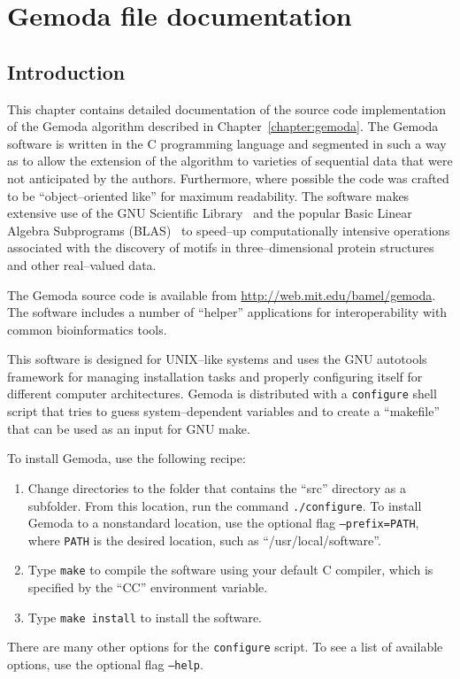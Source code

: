 
\setlength{\parindent}{0cm}
\setlength{\parskip}{0.2cm}
\addtocounter{secnumdepth}{1}
\sloppy



\chapter{Gemoda file documentation}\label{chapter:gfiles}
\section{Introduction}
    This chapter contains detailed documentation of the source code
    implementation of the Gemoda algorithm described in
    Chapter~\vref{chapter:gemoda}.
    The Gemoda software is written in the C programming language
    and
    segmented in such a way as to allow the extension of the
    algorithm to varieties of sequential data that were not
    anticipated by the authors.  Furthermore, where possible the
    code was crafted to be ``object--oriented like'' for maximum
    readability.  The software makes extensive use of the GNU
    Scientific Library~\cite{galassi2003gnu} and the popular Basic Linear
    Algebra Subprograms
    (BLAS)~\cite{blackford2002updated,dongarra2002basicI,dongarra2002basicII}
    to speed--up computationally intensive operations associated
    with the discovery of motifs in three--dimensional protein
    structures and other real--valued data.

    The Gemoda source code is available from \url{http://web.mit.edu/bamel/gemoda}.
    The software includes a number of ``helper'' applications
    for interoperability with common bioinformatics
    tools.

    This software is designed for UNIX--like systems and
     uses the GNU autotools framework for managing
    installation tasks and properly configuring itself for different
    computer architectures.  Gemoda is distributed with a
    \texttt{configure} shell script that tries to guess
    system--dependent variables and to create a ``makefile'' that
    can be used as an input for GNU make.

    To install Gemoda, use the following recipe:
    \begin{enumerate}
      \item Change directories to the folder that contains the ``src''
      directory as a subfolder.  From this location, run the command
      \texttt{./configure}.  To install Gemoda to a nonstandard
      location, use the optional flag \texttt{--prefix=PATH}, where
      \texttt{PATH} is the desired location, such as
      ``/usr/local/software''.
      \item Type \texttt{make} to compile the software using your
      default C compiler, which is specified by the ``CC''
      environment variable.
      \item Type \texttt{make install} to install the software.
    \end{enumerate}
    There are many other options for the \texttt{configure} script.
    To see a list of available options, use the optional flag \texttt{--help}.

